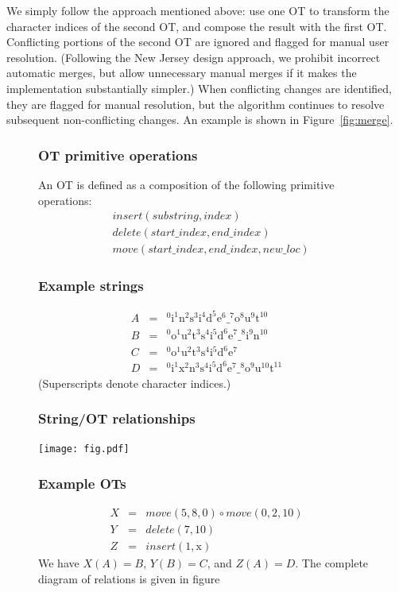 \documentclass[11pt,titlepage]{article}
\begin{document}
We simply follow the approach mentioned above: use one OT to transform
the character indices of the second OT, and compose the result with
the first OT.  Conflicting portions of the second OT are ignored and
flagged for manual user resolution.  (Following the New Jersey design
approach, we prohibit incorrect automatic merges, but allow
unnecessary manual merges if it makes the implementation substantially
simpler.)  When conflicting changes are identified, they are flagged
for manual resolution, but the algorithm continues to resolve
subsequent non-conflicting changes.  An example is shown in
Figure~\ref{fig:merge}.

\begin{figure}[h]
  \centering
  \begin{minipage}{\textwidth}
    \begin{multicols}{2}
      \setlength{\parskip}{-6pt}
      \subsubsection*{OT primitive operations}
      An OT is defined as a composition of the following primitive
      operations:
      \begin{eqnarray*}
        &insert(substring, index) \\
        &delete(start\_index, end\_index) \\
        &move(start\_index, end\_index, new\_loc)
      \end{eqnarray*}      
      \subsubsection*{Example strings}
      \begin{eqnarray*}
        A &=& \mathrm{^0i^1n^2s^3i^4d^5e^6\_^7o^8u^9t^{10}} \\
        B &=& \mathrm{^0o^1u^2t^3s^4i^5d^6e^7\_^8i^9n^{10}} \\
        C &=& \mathrm{^0o^1u^2t^3s^4i^5d^6e^7} \\
        D &=& \mathrm{^0i^1x^2n^3s^4i^5d^6e^7\_^8o^9u^{10}t^{11}}
      \end{eqnarray*}
      (Superscripts denote character indices.)
      \subsubsection*{String/OT relationships}
      \texttt{[image: fig.pdf]}
      \subsubsection*{Example OTs}
      \begin{eqnarray*}
        X &=& move(5, 8, 0) \circ move(0, 2, 10) \\
        Y &=& delete(7, 10) \\
        Z &=& insert(1, \mathrm{x})
      \end{eqnarray*}
      We have \(X(A) = B\), \(Y(B) = C\), and \(Z(A) = D\).  The
      complete diagram of relations is given in figure 

\end{multicols}
\end{minipage}
\end{figure}
\end{document}
